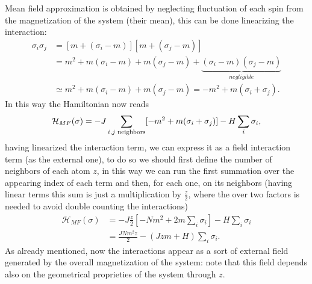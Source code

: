 Mean field approximation is obtained by neglecting fluctuation of each spin from the magnetization of the system (their mean), this can be done linearizing the interaction:
\begin{align*}
    \sigma_i\sigma_j &= [m+(\sigma_i-m)][m+(\sigma_j-m)]\\&=m^2+m(\sigma_i-m)+m(\sigma_j-m)+\underbrace{(\sigma_i-m)(\sigma_j-m)}_{negligible}\\&\simeq m^2+m(\sigma_i-m)+m(\sigma_j-m)=-m^2+m(\sigma_i+\sigma_j).
\end{align*} 
In this way the Hamiltonian now reads
\begin{equation*}
    \mathcal{H}_{MF}(\sigma)=-J\sum_{i,j \\\text{ neighbors}} [-m^2+m(\sigma_i+\sigma_j)]-H\sum_i \sigma_i,
\end{equation*}
having linearized the interaction term, we can express it as a field interaction term (as the external one), to do so we should first define the number of neighbors of each atom $z$, in this way we can run the first summation over the appearing index of each term and then, for each one, on its neighbors (having linear terms this sum is just a multiplication by $\frac{z}{2}$, where the over two factors is needed to avoid double counting the interactions)
\begin{align}
    \nonumber 
    \mathcal{H}_{MF}(\sigma)&=-J\frac{z}{2}[-Nm^2+2m\sum_{i}\sigma_i]-H\sum_i \sigma_i\\
    \label{mean_field_hamiltonian}&=\frac{JNm^2z}{2}-(Jzm+H)\sum_{i}\sigma_i.
\end{align}
As already mentioned, now the interactions appear as a sort of external field generated by the overall magnetization of the system: note that this field depends also on the geometrical proprieties of the system through $z$.

